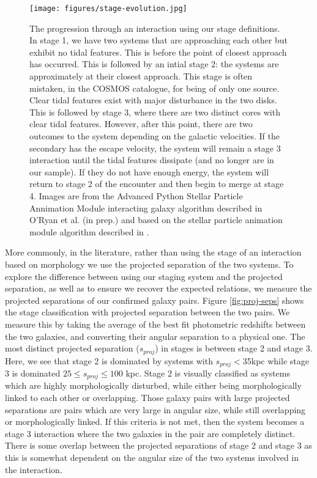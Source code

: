 \documentclass[fleqn,usenatbib]{mnras}
\begin{document}
\begin{figure*}
    \centering
    \texttt{[image: figures/stage-evolution.jpg]}
    \caption{The progression through an interaction using our stage definitions. In stage 1, we have two systems that are approaching each other but exhibit no tidal features. This is before the point of closest approach has occurred. This is followed by an intial stage 2: the systems are approximately at their closest approach. This stage is often mistaken, in the COSMOS catalogue, for being of only one source. Clear tidal features exist with major disturbance in the two disks. This is followed by stage 3, where there are two distinct cores with clear tidal features. However, after this point, there are two outcomes to the system depending on the galactic velocities. If the secondary has the escape velocity, the system will remain a stage 3 interaction until the tidal features dissipate (and no longer are in our sample). If they do not have enough energy, the system will return to stage 2 of the encounter and then begin to merge at stage 4. Images are from the Advanced Python Stellar Particle Annimation Module interacting galaxy algorithm described in O'Ryan et al. (in prep.) and based on the stellar particle animation module algorithm described in \citet{2016A&C....16...26W}.}
    \label{fig:illustration}
\end{figure*}

More commonly, in the literature, rather than using the stage of an interaction based on morphology we use the projected separation of the two systems. To explore the difference between using our staging system and the projected separation, as well as to ensure we recover the expected relations, we measure the projected separations of our confirmed galaxy pairs. Figure \ref{fig:proj-seps} shows the stage classification with projected separation between the two pairs. We measure this by taking the average of the best fit photometric redshifts between the two galaxies, and converting their angular separation to a physical one. The most distinct projected separation ($s_{proj}$) in stages is between stage 2 and stage 3. Here, we see that stage 2 is dominated by systems with $s_{proj}<$35kpc while stage 3 is dominated $25 \leq s_{proj} \leq 100$ kpc. Stage 2 is visually classified as systems which are highly morphologically disturbed, while either being morphologically linked to each other or overlapping. Those galaxy pairs with large projected separations are pairs which are very large in angular size, while still overlapping or morphologically linked. If this criteria is not met, then the system becomes a stage 3 interaction where the two galaxies in the pair are completely distinct. There is some overlap between the projected separations of stage 2 and stage 3 as this is somewhat dependent on the angular size of the two systems involved in the interaction. 
\end{document}
